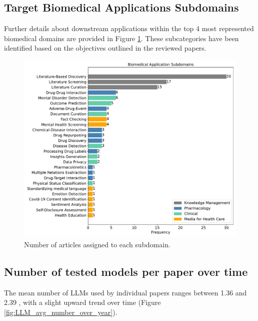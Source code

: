 \documentclass[fleqn,10pt]{olplainarticle}
\begin{document}
\subsection*{Target Biomedical Applications Subdomains}
Further details about downstream applications within the top 4 most represented biomedical domains are provided in Figure \ref{fig:nr_articles_per_subdomain}. These subcategories have been identified based on the objectives outlined in the reviewed papers.

\begin{figure}[h]
\begin{center}
\includegraphics[scale=0.4]{visuals/new_pdf/number_of_papers_subdomain_count_2024.pdf} %
\caption{Number of articles assigned to each subdomain.}
\label{fig:nr_articles_per_subdomain}
\end{center}
\end{figure}

\subsection*{Number of tested models per paper over time}

The mean number of LLMs used by individual papers ranges between 1.36 and 2.39 , with a slight upward trend over time (Figure \ref{fig:LLM_avg_number_over_year}).
\end{document}
